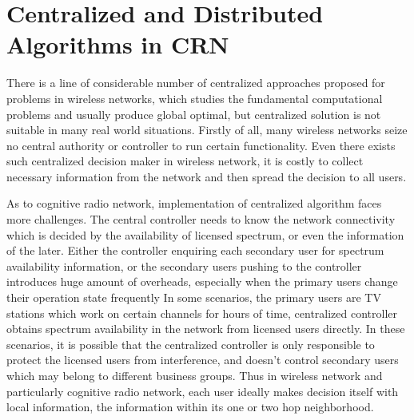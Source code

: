 

\section{Centralized and Distributed Algorithms in CRN}
\label{centralized_distributed}
There is a line of considerable number of centralized approaches proposed for problems in wireless networks, which studies the fundamental computational problems and usually produce global optimal, but centralized solution is not suitable in many real world situations.
Firstly of all, many wireless networks seize no central authority or controller to run certain functionality.
Even there exists such centralized decision maker in wireless network, it is costly to collect necessary information from the network and then spread the decision to all users.

As to cognitive radio network, implementation of centralized algorithm faces more challenges.
The central controller needs to know the network connectivity which is decided by the availability of licensed spectrum, or even the information of the later.
Either the controller enquiring each secondary user for spectrum availability information, or the secondary users pushing to the controller introduces huge amount of overheads, especially when the primary users change their operation state frequently
In some scenarios, \eg the primary users are TV stations which work on certain channels for hours of time, centralized controller obtains spectrum availability in the network from licensed users directly.
In these scenarios, it is possible that the centralized controller is only responsible to protect the licensed users from interference, and doesn't control secondary users which may belong to different business groups.
Thus in wireless network and particularly cognitive radio network, each user ideally makes decision itself with local information, \ie the information within its one or two hop neighborhood.


